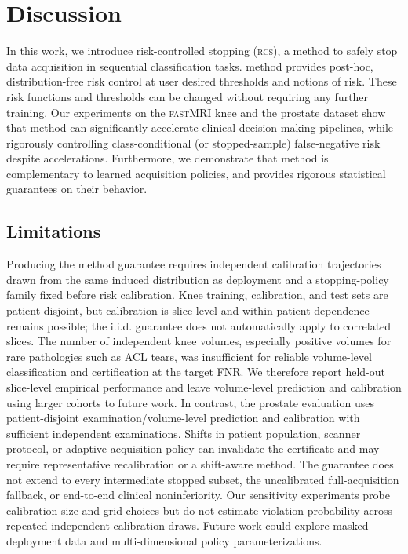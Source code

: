 \section{Discussion}
In this work, we introduce risk-controlled stopping (\textsc{rcs}), a method to safely stop data acquisition in sequential classification tasks. \gls{method} provides post-hoc, distribution-free risk control at user desired thresholds and notions of risk. These risk functions and thresholds can be changed without requiring any further training. Our experiments on the \textsc{fastMRI} knee and the prostate dataset show that \gls{method} can significantly accelerate clinical decision making pipelines, while rigorously controlling class-conditional (or stopped-sample) false-negative risk despite accelerations. Furthermore, we demonstrate that \gls{method} is complementary to learned acquisition policies, and provides rigorous statistical guarantees on their behavior. 

\subsection{Limitations}
Producing the \gls{method} guarantee requires independent calibration trajectories drawn from the same induced distribution as deployment and a stopping-policy family fixed before risk calibration. Knee training, calibration, and test sets are patient-disjoint, but calibration is slice-level and within-patient dependence remains possible; the i.i.d. guarantee does not automatically apply to correlated slices. The number of independent knee volumes, especially positive volumes for rare pathologies such as ACL tears, was insufficient for reliable volume-level classification and certification at the target FNR. We therefore report held-out slice-level empirical performance and leave volume-level prediction and calibration using larger cohorts to future work. In contrast, the prostate evaluation uses patient-disjoint examination/volume-level prediction and calibration with sufficient independent examinations. Shifts in patient population, scanner protocol, or adaptive acquisition policy can invalidate the certificate and may require representative recalibration or a shift-aware method. The guarantee does not extend to every intermediate stopped subset, the uncalibrated full-acquisition fallback, or end-to-end clinical noninferiority. Our sensitivity experiments probe calibration size and grid choices but do not estimate violation probability across repeated independent calibration draws. Future work could explore masked deployment data and multi-dimensional policy parameterizations.